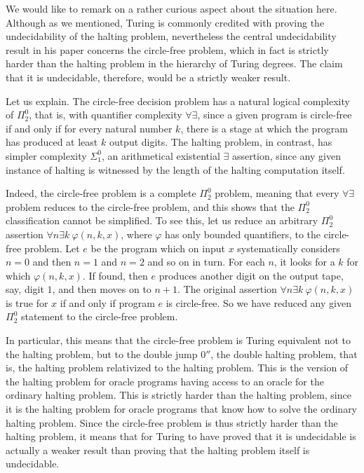 \documentclass{amsart}
\begin{document}
We would like to remark on a rather curious aspect about the situation here. Although as we mentioned, Turing is commonly credited with proving the undecidability of the halting problem, nevertheless the central undecidability result in his paper concerns the circle-free problem, which in fact is strictly harder than the halting problem in the hierarchy of Turing degrees. The claim that it is undecidable, therefore, would be a strictly weaker result.

Let us explain. The circle-free decision problem has a natural logical complexity of $\Pi^0_2$, that is, with quantifier complexity $\forall\exists$, since a given program is circle-free if and only if for every natural number $k$, there is a stage at which the program has produced at least $k$ output digits. The halting problem, in contrast, has simpler complexity $\Sigma^0_1$, an arithmetical existential $\exists$ assertion, since any given instance of halting is witnessed by the length of the halting computation itself.

Indeed, the circle-free problem is a complete $\Pi^0_2$ problem, meaning that every $\forall\exists$ problem reduces to the circle-free problem, and this shows that the $\Pi^0_2$ classification cannot be simplified. To see this, let us reduce an arbitrary $\Pi^0_2$ assertion $\forall n\exists k\ \varphi(n,k,x)$, where $\varphi$ has only bounded quantifiers, to the circle-free problem. Let $e$ be the program which on input $x$ systematically considers $n=0$ and then $n=1$ and $n=2$ and so on in turn. For each $n$, it looks for a $k$ for which $\varphi(n,k,x)$. If found, then $e$ produces another digit on the output tape, say, digit $1$, and then moves on to $n+1$. The original assertion $\forall n\exists k\ \varphi(n,k,x)$ is true for $x$ if and only if program $e$ is circle-free. So we have reduced any given $\Pi^0_2$ statement to the circle-free problem. 

In particular, this means that the circle-free problem is Turing equivalent not to the halting problem, but to the double jump $0''$, the double halting problem, that is, the halting problem relativized to the halting problem. This is the version of the halting problem for oracle programs having access to an oracle for the ordinary halting problem. This is strictly harder than the halting problem, since it is the halting problem for oracle programs that know how to solve the ordinary halting problem. Since the circle-free problem is thus strictly harder than the halting problem, it means that for Turing to have proved that it is undecidable is actually a weaker result than proving that the halting problem itself is undecidable.
\end{document}
